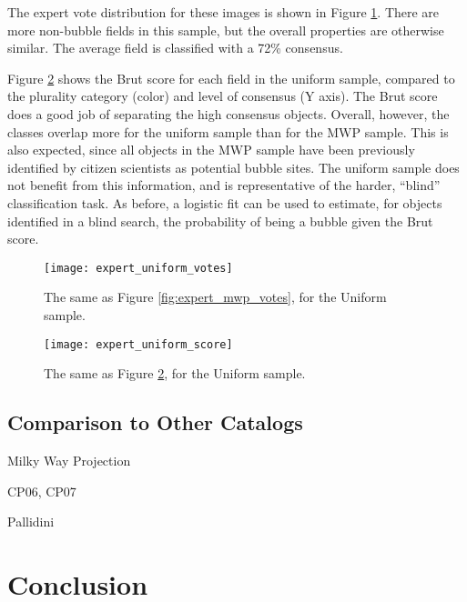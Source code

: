 \documentclass[preprint]{aastex}
\begin{document}
The expert vote distribution for these images is shown in Figure \ref{fig:expert_uniform_votes}. There are more non-bubble fields in this sample, but the overall properties are otherwise similar. The average field is classified with a 72\% consensus.

Figure \ref{fig:expert_uniform_score} shows the Brut score for each field in the uniform sample, compared to the plurality category (color) and level of consensus (Y axis). The Brut score does a good job of separating the high consensus objects. Overall, however, the classes overlap more for the uniform sample than for the MWP sample. This is also expected, since all objects in the MWP sample have been previously identified by citizen scientists as potential bubble sites. The uniform sample does not benefit from this information, and is representative of the harder, ``blind'' classification task. As before, a logistic fit can be used to estimate, for objects identified in a blind search, the probability of being a bubble given the Brut score.

\begin{figure}
\texttt{[image: expert\_uniform\_votes]}
\caption{The same as Figure \ref{fig:expert_mwp_votes}, for the Uniform sample.}
\label{fig:expert_uniform_votes}
\end{figure}

\begin{figure}
\texttt{[image: expert\_uniform\_score]}
\caption{The same as Figure \ref{fig:expert_uniform_score}, for the Uniform sample.}
\label{fig:expert_uniform_score}
\end{figure}



\subsection{Comparison to Other Catalogs}
\label{sec:comparison}
Milky Way Projection

CP06, CP07

Pallidini



\section{Conclusion}
\label{sec:conclusion}
\end{document}
